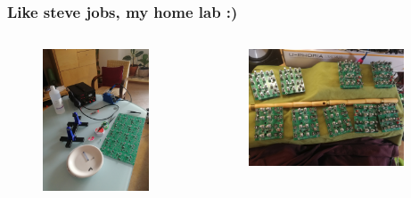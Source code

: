 \begin{frame}
	\frametitle{Like steve jobs, my home lab :)}
\begin{columns}
\begin{column}{0.35\textwidth}
	\begin{figure}[H]
		\centering
		\includegraphics[width=0.92\textwidth]{atelier_maison1.jpg}
	\end{figure}
\end{column}
\begin{column}{0.65\textwidth}
	\begin{figure}[H]
		\centering
		\includegraphics[width=0.9\textwidth]{atelier_maison2.jpg}
	\end{figure}
\end{column}
\end{columns}
\end{frame}

